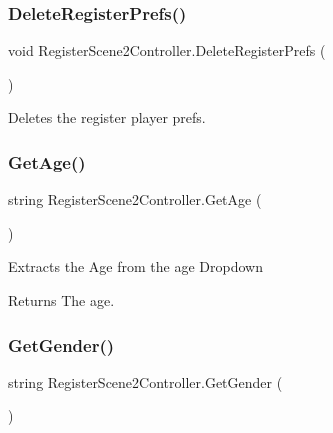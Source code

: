 \subsubsection{\texorpdfstring{Delete\+Register\+Prefs()}{DeleteRegisterPrefs()}}
{\footnotesize\ttfamily void Register\+Scene2\+Controller.\+Delete\+Register\+Prefs (\begin{DoxyParamCaption}{ }\end{DoxyParamCaption})\hspace{0.3cm}{\ttfamily [inline]}}



Deletes the register player prefs. 

\mbox{\label{classRegisterScene2Controller_ade60e30592994cf279a6ffb48699ac5e}} 
\subsubsection{\texorpdfstring{Get\+Age()}{GetAge()}}
{\footnotesize\ttfamily string Register\+Scene2\+Controller.\+Get\+Age (\begin{DoxyParamCaption}{ }\end{DoxyParamCaption})\hspace{0.3cm}{\ttfamily [inline]}}



Extracts the Age from the age Dropdown 

\begin{DoxyReturn}{Returns}
The age.
\end{DoxyReturn}
\mbox{\label{classRegisterScene2Controller_a3b9df3bcb8be64cec2f585fc15722ab8}} 
\subsubsection{\texorpdfstring{Get\+Gender()}{GetGender()}}
{\footnotesize\ttfamily string Register\+Scene2\+Controller.\+Get\+Gender (\begin{DoxyParamCaption}{ }\end{DoxyParamCaption})\hspace{0.3cm}{\ttfamily [inline]}}

